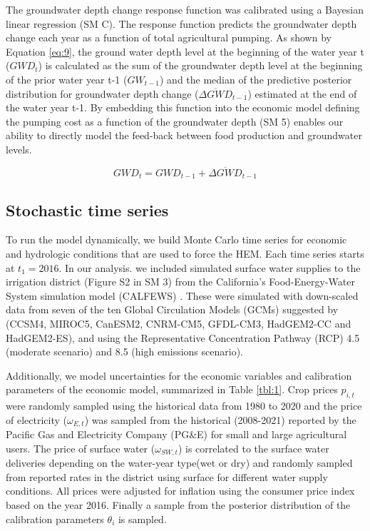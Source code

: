 \documentclass[a4paper,fleqn]{cas-sc}
\begin{document}
The groundwater depth change response function was calibrated using a Bayesian linear regression (SM C). The response function predicts the groundwater depth change each year as a function of total agricultural pumping. As shown by Equation \ref{eq:9}, the ground water depth level at the beginning of the water year t ($GWD_{t}$) is calculated as the sum of the groundwater depth level at the beginning of the prior water year t-1 ($GW_{t-1}$)  and the median of the predictive posterior distribution for groundwater depth change ($\overline{\Delta GWD}_{t-1}$) estimated at the end of the water year t-1. By embedding this function into the economic model defining the pumping cost as a function of the groundwater depth (SM 5) enables our ability to directly model the feed-back between food production and groundwater levels. 

\begin{equation}
\label{eq:9}
GWD_{t} = GWD_{t-1} + \overline{\Delta GWD}_{t-1}
\end{equation}

\subsection{Stochastic time series}\label{sct:2.2}

To run the model dynamically, we build Monte Carlo time series for economic and hydrologic conditions that are used to force the HEM. Each time series starts at $t_{1}=2016$. In our analysis. we included simulated surface water supplies to the irrigation district (Figure S2 in SM 3) from the California’s Food-Energy-Water System simulation model (CALFEWS) \citep{zeff_californias_2021}. These were simulated with down-scaled data from seven of the ten Global Circulation Models (GCMs) suggested by \citet{pierce_climate_2018} (CCSM4, MIROC5, CanESM2, CNRM-CM5, GFDL-CM3, HadGEM2-CC and HadGEM2-ES), and using the Representative Concentration Pathway (RCP) 4.5 (moderate scenario) and 8.5 (high emissions scenario). 

Additionally, we model uncertainties for the economic variables and calibration parameters of the economic model, summarized in Table \ref{tbl:1}. Crop prices $p_{i,t}$ were randomly sampled using the historical data from 1980 to 2020 \citep{usda_national_2020} and the price of electricity ($\omega_{E,t}$) was sampled from the historical (2008-2021) reported by the Pacific Gas and Electricity Company (PG\&E) for small and large agricultural users. The price of surface water ($\omega_{SW,t}$) is correlated to the surface water deliveries depending on the water-year type(wet or dry) and randomly sampled from reported rates in the district using surface for different water supply conditions. All prices were adjusted for inflation using the consumer price index based on the year 2016. Finally a sample from the posterior distribution of the calibration parameters $\theta_{i}$ is sampled.
\end{document}
